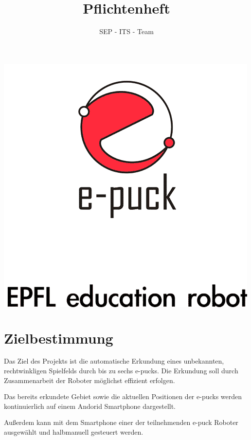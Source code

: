 \documentclass[10pt,a4paper]{article}
\author{SEP - ITS - Team}
\title{Pflichtenheft}
\begin{document}
	\maketitle
	\includegraphics[scale=0.5, origin=c]{logo.png}
	\newpage
	\section{Zielbestimmung}
		Das Ziel des Projekts ist die automatische Erkundung eines unbekannten, rechtwinkligen Spielfelds durch bis zu
		sechs e-pucks. Die Erkundung soll durch Zusammenarbeit der Roboter möglichst effizient erfolgen.
		
		Das bereits erkundete Gebiet sowie die aktuellen Positionen der e-pucks werden kontinuierlich auf einem
		Andorid Smartphone dargestellt.
		
		Außerdem kann mit dem Smartphone einer der teilnehmenden e-puck Roboter ausgewählt und halbmanuell gesteuert werden.
\end{document}
